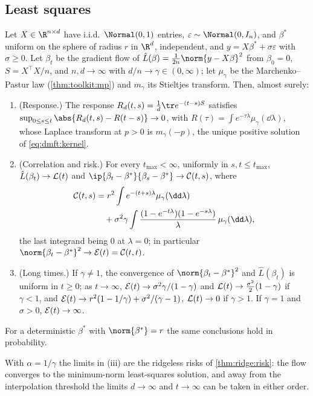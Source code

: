 \begin{refsection}
\subsection{Least squares}

\begin{theorem}\label{thm:dmft:leastsquares}
Let $X\in\R^{n\times d}$ have i.i.d.\ $\Normal(0,1)$ entries, $\varepsilon\sim\Normal(0,I_n)$, and $\beta^*$ uniform on the sphere of radius $r$ in $\R^d$, independent, and $y=X\beta^*+\sigma\varepsilon$ with $\sigma\ge0$. Let $\beta_t$ be the gradient flow of $\hat L(\beta)=\frac1{2n}\norm{y-X\beta}^2$ from $\beta_0=0$, $S=X^\top X/n$, and $n,d\to\infty$ with $d/n\to\gamma\in(0,\infty)$; let $\mu_\gamma$ be the Marchenko--Pastur law (\cref{thm:toolkit:mp}) and $m_\gamma$ its Stieltjes transform. Then, almost surely:
\begin{enumerate}
\item (Response.) The response $R_d(t,s)=\frac1d\tr e^{-(t-s)S}$ satisfies $\sup_{0\le s\le t}\abs{R_d(t,s)-R(t-s)}\to0$, with $R(\tau)=\int e^{-\tau\lambda}\mu_\gamma(\dd\lambda)$, whose Laplace transform at $p>0$ is $m_\gamma(-p)$, the unique positive solution of \eqref{eq:dmft:kernel}.
\item (Correlation and risk.) For every $t_{\max}<\infty$, uniformly in $s,t\le t_{\max}$, $\hat L(\beta_t)\to\mathcal{L}(t)$ and $\ip{\beta_t-\beta^*}{\beta_s-\beta^*}\to\dmftC(t,s)$, where
\begin{align*}
\dmftC(t,s)&=r^2\int e^{-(t+s)\lambda}\mu_\gamma(\dd\lambda)\\
&\quad+\sigma^2\gamma\int\frac{(1-e^{-t\lambda})(1-e^{-s\lambda})}\lambda\,\mu_\gamma(\dd\lambda),
\end{align*}
the last integrand being $0$ at $\lambda=0$; in particular $\norm{\beta_t-\beta^*}^2\to\dmftE(t)=\dmftC(t,t)$.
\item (Long times.) If $\gamma\ne1$, the convergence of $\norm{\beta_t-\beta^*}^2$ and $\hat L(\beta_t)$ is uniform in $t\ge0$; as $t\to\infty$, $\mathcal{E}(t)\to\sigma^2\gamma/(1-\gamma)$ and $\mathcal{L}(t)\to\frac{\sigma^2}2(1-\gamma)$ if $\gamma<1$, and $\mathcal{E}(t)\to r^2(1-1/\gamma)+\sigma^2/(\gamma-1)$, $\mathcal{L}(t)\to0$ if $\gamma>1$. If $\gamma=1$ and $\sigma>0$, $\mathcal{E}(t)\to\infty$.
\end{enumerate}
For a deterministic $\beta^*$ with $\norm{\beta^*}=r$ the same conclusions hold in probability.
\end{theorem}

With $\alpha=1/\gamma$ the limits in (iii) are the ridgeless risks of \cref{thm:ridge:risk}: the flow converges to the minimum-norm least-squares solution, and away from the interpolation threshold the limits $d\to\infty$ and $t\to\infty$ can be taken in either order.


\end{refsection}
